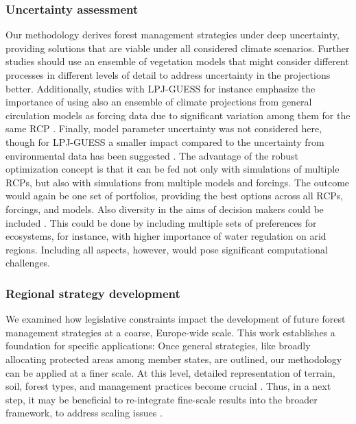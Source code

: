 \documentclass[]{article}
\begin{document}
\subsubsection{Uncertainty assessment}
Our methodology derives forest management strategies under deep uncertainty, providing solutions that are viable under all considered climate scenarios.
Further studies should use an ensemble of vegetation models that might consider different processes in different levels of detail to address uncertainty in the projections better.
Additionally, studies with LPJ-GUESS for instance emphasize the importance of using also an ensemble of climate projections from general circulation models as forcing data due to significant variation among them for the same RCP \parencite{Ahlstrom2012}. 
Finally, model parameter uncertainty was not considered here, though for LPJ-GUESS  a smaller impact compared to the uncertainty from environmental data has been suggested \parencite{oberprillerClimateParameterSensitivity2022}.
The advantage of the robust optimization concept is that it can be fed not only with simulations of multiple RCPs, but also with simulations from multiple models and forcings. The outcome would again be one set of portfolios, providing the best options across all RCPs, forcings, and models. 
Also diversity in the aims of decision makers could be included \parencite[e.g.,][]{Knoke2023}. This could be done by including multiple sets of preferences for ecosystems, for instance, with higher importance of water regulation on arid regions.
Including all aspects, however, would pose significant computational challenges.

\subsubsection{Regional strategy development}

We examined how legislative constraints impact the development of future forest management strategies at a coarse, Europe-wide scale. This work establishes a foundation for specific applications: Once general strategies, like broadly allocating protected areas among member states, are outlined, our methodology can be applied at a finer scale. At this level, detailed representation of terrain, soil, forest types, and management practices become crucial \parencite{TURNER1996, TURNER1989, Levin1992}. Thus, in a next step, it may be beneficial to re-integrate fine-scale results into the broader framework, to address scaling issues \parencite{Seidl2013}.
\end{document}
